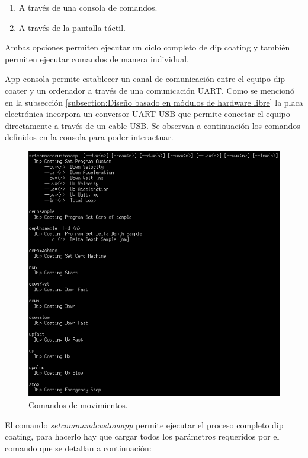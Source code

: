 \begin{enumerate}
\item A través de una consola de comandos.
\item A través de la pantalla táctil.
\end{enumerate}

Ambas opciones permiten ejecutar un ciclo completo de dip coating y también permiten ejecutar comandos de manera individual.

App consola permite establecer un canal de comunicación entre el equipo dip coater y un ordenador a través de una comunicación UART. Como se mencionó en la subsección \ref{subsection:Diseño basado en módulos de hardware libre} la placa electrónica incorpora un conversor UART-USB que permite conectar el  equipo directamente a través de un cable USB. Se observan a continuación los comandos definidos en la consola para poder interactuar.

\begin{figure}[h!]
	\centering
	\includegraphics[width=1\textwidth]{./Figures/consola_2.png}
	\caption{Comandos de movimientos.}
	\label{fig:consola_movimientos}
\end{figure}

El comando \textit{setcommandcustomapp} permite ejecutar el proceso completo  dip coating, para hacerlo hay que cargar todos los parámetros requeridos por el comando que se detallan a continuación: 

